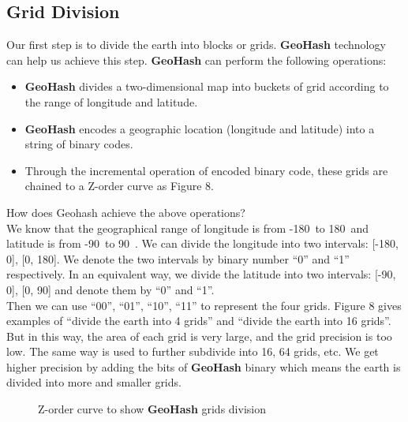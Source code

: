 \documentclass[sigplan,screen]{acmart}
\begin{document}
\subsection{Grid Division}
Our first step is to divide the earth into blocks or grids. \textbf{GeoHash} technology can help us achieve this step.
\textbf{GeoHash} can perform the following operations:
\begin{itemize}
	\item \textbf{GeoHash} divides a two-dimensional map into buckets of grid according to the range of longitude and latitude.
	\item \textbf{GeoHash} encodes a geographic location (longitude and latitude) into a string of binary codes.
	\item Through the incremental operation of encoded binary code, these grids are chained to a Z-order curve as Figure 8.
\end{itemize}
How does Geohash achieve the above operations?
\\
We know that the geographical range of longitude is from -180\degree\ to 180\degree\ and latitude is from -90\degree\ to 90\degree\ \cite{crossley1999guide}.
We can divide the longitude into two intervals: [-180\degree, 0\degree], [0\degree, 180\degree].
We denote the two intervals by binary number ``0'' and ``1'' respectively.
In an equivalent way, we divide the latitude into two intervals: [-90\degree, 0\degree], [0\degree, 90\degree] and denote them by ``0'' and ``1''.
\\
Then we can use ``00'', ``01'', ``10'', ``11'' to represent the four grids.
Figure 8 gives examples of ``divide the earth into 4 grids'' and ``divide the earth into 16 grids''.
But in this way, the area of each grid is very large, and the grid precision is too low.
The same way is used to further subdivide into 16, 64 grids, etc.
We get higher precision by adding the bits of \textbf{GeoHash} binary which means the earth is divided into more and smaller grids.
\begin{figure}[htb]
	\centering
	\caption{Z-order curve to show \textbf{GeoHash} grids division}
\end{figure}
\end{document}
